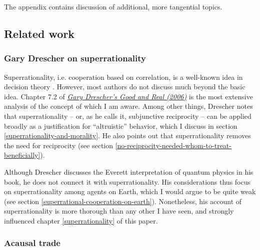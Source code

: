 The appendix contains discussion of additional, more tangential topics.

\hypertarget{related-work}{\subsection{Related
work}\label{related-work}}

\hypertarget{gary-drescher-on-superrationality}{\subsubsection{Gary
Drescher on superrationality}\label{gary-drescher-on-superrationality}}

Superrationality, i.e. cooperation based on correlation, is a well-known
idea in decision theory
\parencite{Kuhn2017-tl,Horgan1981-hb,Hofstadter1983-az,Campbell1985-sx,Ahmed2014-ec}.
However, most authors do not discuss much beyond the basic idea. Chapter
7.2 of
\href{https://www.gwern.net/docs/2006-drescher-goodandreal.pdf}{\emph{Gary
Drescher's Good and Real (2006)}} is the most extensive analysis
of the concept of which I am aware. Among other things, Drescher notes
that superrationality -- or, as he calls it, subjunctive reciprocity --
can be applied broadly as a justification for ``altruistic'' behavior,
which I discuss in section
\ref{superrationality-and-morality}. He also points out that superrationality removes the
need for reciprocity (see section
\ref{no-reciprocity-needed-whom-to-treat-beneficially}).

Although Drescher discusses the Everett interpretation of quantum
physics in his book, he does not connect it with superrationality. His
considerations thus focus on superrationality among agents on Earth,
which I would argue to be quite weak (see section
\ref{superrational-cooperation-on-earth}). Nonetheless, his account of superrationality is more
thorough than any other I have seen, and strongly influenced chapter \ref{superrationality} of this
paper.

\hypertarget{acausal-trade}{\subsubsection{Acausal
trade}\label{acausal-trade}}

